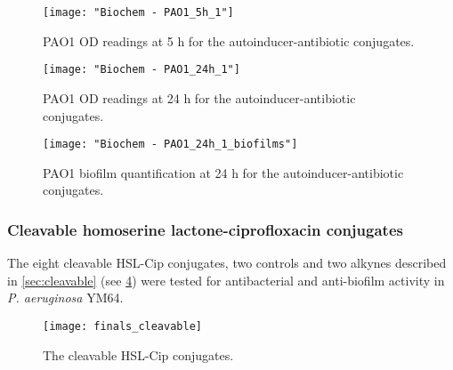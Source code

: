 \begin{figure}[H]
	\begin{center}
		\texttt{[image: "Biochem - PAO1\_5h\_1"]}
		\caption{PAO1 OD readings at 5 h for the autoinducer-antibiotic conjugates.\label{fgr:PAO1_5h}}
	\end{center}
\end{figure}

\begin{figure}[H]
	\begin{center}
		\texttt{[image: "Biochem - PAO1\_24h\_1"]}
		\caption{PAO1 OD readings at 24 h for the autoinducer-antibiotic conjugates.\label{fgr:PAO1_24h}}
	\end{center}
\end{figure}

\begin{figure}[H]
	\begin{center}
		\texttt{[image: "Biochem - PAO1\_24h\_1\_biofilms"]}
		\caption{PAO1 biofilm quantification at 24 h for the autoinducer-antibiotic conjugates.\label{fgr:PAO1_biofilms}}
	\end{center}
\end{figure}

\subsubsection{Cleavable homoserine lactone-ciprofloxacin conjugates\label{sec:bioC}}

The eight cleavable HSL-Cip conjugates, two controls and two alkynes described in \ref{sec:cleavable} (see \ref{fgr:finals_cleavable}) were tested for antibacterial and anti-biofilm activity in \textit{P. aeruginosa} YM64. 

\begin{figure}[H]
	\begin{center}
		\texttt{[image: finals\_cleavable]}
		\caption{The cleavable HSL-Cip conjugates.
 		\label{fgr:finals_cleavable}}
	\end{center}
\end{figure}

